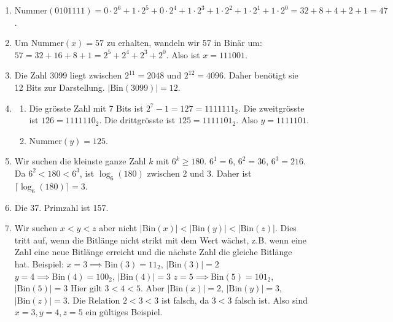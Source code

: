 \begin{questions}
\begin{solution}
\begin{enumerate}
  \item \(\text{Nummer}(0101111) = 0 \cdot 2^6 + 1 \cdot 2^5 + 0 \cdot 2^4 + 1 \cdot 2^3 + 1 \cdot 2^2 + 1 \cdot 2^1 + 1 \cdot 2^0 = 32 + 8 + 4 + 2 + 1 = 47\).
  \item Um $\text{Nummer}(x) = 57$ zu erhalten, wandeln wir 57 in Binär um: $57 = 32 + 16 + 8 + 1 = 2^5 + 2^4 + 2^3 + 2^0$. Also ist $x = 111001$.
  \item Die Zahl 3099 liegt zwischen $2^{11} = 2048$ und $2^{12} = 4096$. Daher benötigt sie 12 Bits zur Darstellung. $|\text{Bin}(3099)| = 12$.
  \item
  \begin{enumerate}
    \item Die grösste Zahl mit 7 Bits ist $2^7 - 1 = 127 = 1111111_2$.
    Die zweitgrösste ist $126 = 1111110_2$.
    Die drittgrösste ist $125 = 1111101_2$. Also $y = 1111101$.
    \item \(\text{Nummer}(y) = 125\).
  \end{enumerate}
  \item Wir suchen die kleinste ganze Zahl $k$ mit $6^k \ge 180$.
  $6^1 = 6$, 
  $6^2 = 36$, 
  $6^3 = 216$. 
  Da $6^2 < 180 < 6^3$, ist $\log_6(180)$ zwischen 2 und 3.
  Daher ist $\lceil\log_6(180)\rceil = 3$.
  \item Die 37. Primzahl ist 157.
  \item Wir suchen $x < y < z$ aber nicht $|\text{Bin}(x)| < |\text{Bin}(y)| < |\text{Bin}(z)|$.
  Dies tritt auf, wenn die Bitlänge nicht strikt mit dem Wert wächst, z.B. wenn eine Zahl eine neue Bitlänge erreicht und die nächste Zahl die gleiche Bitlänge hat.
  Beispiel:
  $x = 3 \implies \text{Bin}(3) = 11_2$, $|\text{Bin}(3)| = 2$
  $y = 4 \implies \text{Bin}(4) = 100_2$, $|\text{Bin}(4)| = 3$
  $z = 5 \implies \text{Bin}(5) = 101_2$, $|\text{Bin}(5)| = 3$
  Hier gilt $3 < 4 < 5$.
  Aber $|\text{Bin}(x)| = 2$, $|\text{Bin}(y)| = 3$, $|\text{Bin}(z)| = 3$.
  Die Relation $2 < 3 < 3$ ist falsch, da $3 < 3$ falsch ist.
  Also sind $x=3, y=4, z=5$ ein gültiges Beispiel.
\end{enumerate}
\end{solution}


\end{questions}

